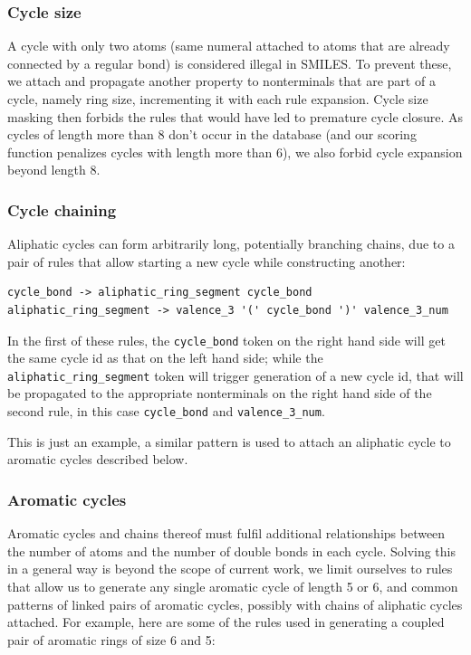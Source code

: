 \documentclass{article}
\begin{document}
\subsubsection{Cycle size}
A cycle with only two atoms (same numeral attached to atoms that are already connected by a regular bond) is considered illegal in SMILES. To prevent these, we attach and propagate another property to nonterminals that are part of a cycle, namely ring size, incrementing it with each rule expansion. Cycle size masking then forbids the rules that would have led to premature cycle closure. As cycles of length more than 8 don't occur in the database (and our scoring function penalizes cycles with length more than 6), we also forbid cycle expansion beyond length 8.
\subsubsection{Cycle chaining}
Aliphatic cycles can form arbitrarily long, potentially branching chains, due to a pair of rules that allow starting a new cycle while constructing another:
{\footnotesize \begin{verbatim}
cycle_bond -> aliphatic_ring_segment cycle_bond
aliphatic_ring_segment -> valence_3 '(' cycle_bond ')' valence_3_num
\end{verbatim}}
In the first of these rules, the \verb|cycle_bond| token on the right hand side will get the same cycle id as that on the left hand side; while the \verb|aliphatic_ring_segment| token will trigger generation of a new cycle id, that will be propagated to the appropriate nonterminals on the right hand side of the second rule, in this case \verb|cycle_bond| and \verb|valence_3_num|.

This is just an example, a similar pattern is used to attach an aliphatic cycle to aromatic cycles described below. 
\subsubsection{Aromatic cycles}
Aromatic cycles and chains thereof must fulfil additional relationships between the number of atoms and the number of double bonds in each cycle. Solving this in a general way is beyond the scope of current work, we limit ourselves to rules that allow us to generate any single aromatic cycle of length 5 or 6, and common patterns of linked pairs of aromatic cycles, possibly with chains of aliphatic cycles attached. For example, here are some of the rules used in generating a coupled pair of aromatic rings of size 6 and 5:
\end{document}
